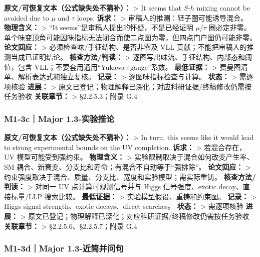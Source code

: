 \documentclass[
  chinese,
  UTF8]{ctexart}
\begin{document}
\textbf{原文/可恢复文本（公式缺失处不猜补）：} \textgreater{} It seems
that \(S\)-\(h\) mixing cannot be avoided due to \(\mu\) and \(\tau\)
loops. \textbf{诉求：} \textgreater{} 审稿人的推测：轻子圈可能诱导混合。
\textbf{物理含义：} \textgreater{} ``It
seems''是审稿人提出的怀疑，不是已经证明
\ensuremath{\mu}/\ensuremath{\tau}
圈必定非零。单个味变顶角可能因味指标无法闭合而使二点图为零，但四点门户图仍可能非零。
\textbf{论文回应：} \textgreater{} 必须检查味/手征结构、是否非零及 VLL
贡献；不能把审稿人的推测当成已证明结论。 \textbf{核查方法/判读：}
\textgreater{} 逐图写出味流、手征结构、内部态和阈值，包含
VLL；不要套用通用``Yukawa×gauge''系数。 \textbf{最低证据：}
\textgreater{} 费曼图清单、解析表达式和独立复核。 \textbf{记录：}
\textgreater{} 逐图味指标检查与计算。 \textbf{状态：} \textgreater{}
需逐项核验 \textbf{进展：} \textgreater{}
原文已登记；物理解释已深化；对应科研证据/终稿修改仍需按任务验收
\textbf{关联章节：} \textgreater{} §2.2.5.3；附录 G.4

\subsubsection{M1-3c｜Major
1.3-实验推论}\label{m1-3cmajor-1.3-ux5b9eux9a8cux63a8ux8bba}

\textbf{原文/可恢复文本（公式缺失处不猜补）：} \textgreater{} In turn,
this seems like it would lead to strong experimental bounds on the UV
completion. \textbf{诉求：} \textgreater{} 若混合存在，UV
模型可能受到强约束。 \textbf{物理含义：} \textgreater{}
实验限制取决于混合如何改变产生率、SM
耦合、新衰变、分支比和寿命；有混合不自动等于``强排除''。
\textbf{论文回应：} \textgreater{}
约束强度取决于混合、质量、分支比、宽度和实验模型；需实际重铸。
\textbf{核查方法/判读：} \textgreater{} 对同一 UV 点计算可观测信号并与
Higgs 信号强度、exotic decay、直接标量/LLP 搜索比较。
\textbf{最低证据：} \textgreater{} 实验模型假设、重铸和约束图。
\textbf{记录：} \textgreater{} Higgs signal strength、exotic
decays、direct searches。 \textbf{状态：} \textgreater{} 需逐项核验
\textbf{进展：} \textgreater{}
原文已登记；物理解释已深化；对应科研证据/终稿修改仍需按任务验收
\textbf{关联章节：} \textgreater{} §2.2.5.6、§2.2.5.7；附录 G.4

\subsubsection{M1-3d｜Major
1.3-近简并问句}\label{m1-3dmajor-1.3-ux8fd1ux7b80ux5e76ux95eeux53e5}
\end{document}
